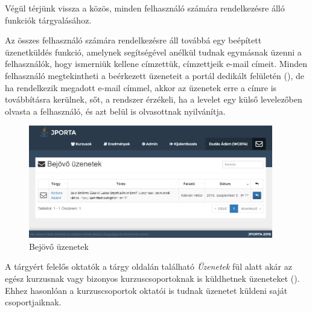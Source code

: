 Végül térjünk vissza a közös, minden felhasználó számára rendelkezésre álló funkciók tárgyalásához.

Az összes felhasználó számára rendelkezésre áll továbbá egy beépített üzenetküldés funkció, amelynek segítségével anélkül tudnak egymásnak üzenni a felhasználók, hogy ismerniük kellene címzettük, címzettjeik e-mail címeit.
Minden felhasználó megtekintheti a beérkezett üzeneteit a portál dedikált felületén (), de ha rendelkezik megadott e-mail címmel, akkor az üzenetek erre a címre is továbbításra kerülnek, sőt, a rendszer érzékeli, ha a levelet egy külső levelezőben olvasta a felhasználó, és azt belül is olvasottnak nyilvánítja.
\begin{figure}[h]
    \centering
    \includegraphics[width=0.95\textwidth]{figures/Jporta-inbox}
    \caption{Bejövő üzenetek}
    \label{figure:jporta-inbox}
\end{figure}
A tárgyért felelős oktatók a tárgy oldalán található \textit{Üzenetek} fül alatt akár az egész kurzusnak vagy bizonyos kurzuscsoportoknak is küldhetnek üzeneteket ().
Ehhez hasonlóan a kurzuscsoportok oktatói is tudnak üzenetet küldeni saját csoportjaiknak.
